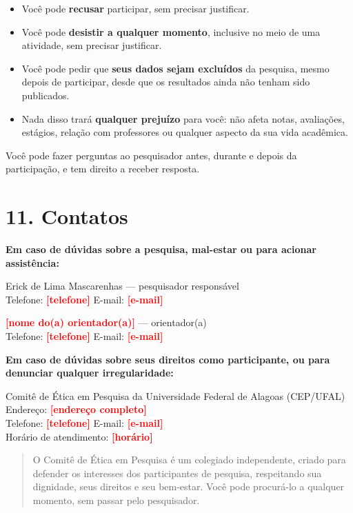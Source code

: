 \documentclass[12pt,a4paper]{article}
\newcommand{\pre}[1]{\textcolor{red}{\textbf{[#1]}}}
\begin{document}
\begin{itemize}
  \item Você pode \textbf{recusar} participar, sem precisar justificar.
  \item Você pode \textbf{desistir a qualquer momento}, inclusive no meio de uma atividade, sem precisar justificar.
  \item Você pode pedir que \textbf{seus dados sejam excluídos} da pesquisa, mesmo depois de participar, desde que os resultados ainda não tenham sido publicados.
  \item Nada disso trará \textbf{qualquer prejuízo} para você: não afeta notas, avaliações, estágios, relação com professores ou qualquer aspecto da sua vida acadêmica.
\end{itemize}

Você pode fazer perguntas ao pesquisador antes, durante e depois da participação,
e tem direito a receber resposta.

\section*{11. Contatos}

\textbf{Em caso de dúvidas sobre a pesquisa, mal-estar ou para acionar
assistência:}

\noindent Erick de Lima Mascarenhas --- pesquisador responsável\\
Telefone: \pre{telefone} \quad E-mail: \pre{e-mail}

\noindent \pre{nome do(a) orientador(a)} --- orientador(a)\\
Telefone: \pre{telefone} \quad E-mail: \pre{e-mail}

\textbf{Em caso de dúvidas sobre seus direitos como participante, ou para
denunciar qualquer irregularidade:}

\noindent Comitê de Ética em Pesquisa da Universidade Federal de Alagoas
(CEP/UFAL)\\
Endereço: \pre{endereço completo}\\
Telefone: \pre{telefone} \quad E-mail: \pre{e-mail}\\
Horário de atendimento: \pre{horário}

\begin{quote}
\small O Comitê de Ética em Pesquisa é um colegiado independente, criado para
defender os interesses dos participantes de pesquisa, respeitando sua dignidade,
seus direitos e seu bem-estar. Você pode procurá-lo a qualquer momento, sem
passar pelo pesquisador.
\end{quote}
\end{document}
